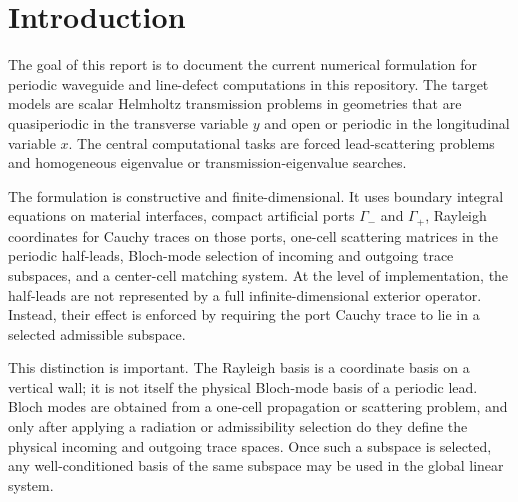 %
%
%
%
%

\section{Introduction}

The goal of this report is to document the current numerical formulation for
periodic waveguide and line-defect computations in this repository.  The target
models are scalar Helmholtz transmission problems in geometries that are
quasiperiodic in the transverse variable \(y\) and open or periodic in the
longitudinal variable \(x\).  The central computational tasks are forced
lead-scattering problems and homogeneous eigenvalue or transmission-eigenvalue
searches.

The formulation is constructive and finite-dimensional.  It uses boundary
integral equations on material interfaces, compact artificial ports
\(\Gamma_-\) and \(\Gamma_+\), Rayleigh coordinates for Cauchy traces on those
ports, one-cell scattering matrices in the periodic half-leads, Bloch-mode
selection of incoming and outgoing trace subspaces, and a center-cell matching
system.  At the level of implementation, the half-leads are not represented by a
full infinite-dimensional exterior operator.  Instead, their effect is enforced
by requiring the port Cauchy trace to lie in a selected admissible subspace.

This distinction is important.  The Rayleigh basis is a coordinate basis on a
vertical wall; it is not itself the physical Bloch-mode basis of a periodic
lead.  Bloch modes are obtained from a one-cell propagation or scattering
problem, and only after applying a radiation or admissibility selection do they
define the physical incoming and outgoing trace spaces.  Once such a subspace is
selected, any well-conditioned basis of the same subspace may be used in the
global linear system.

